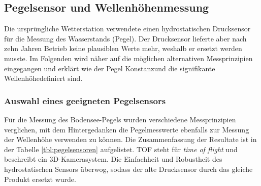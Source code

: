 \subsection{Pegelsensor und Wellenhöhenmessung}
Die ursprüngliche Wetterstation verwendete einen hydrostatischen Drucksensor für die Messung des Wasserstands (Pegel). Der Drucksensor lieferte aber nach zehn Jahren Betrieb keine plausiblen Werte mehr, weshalb er ersetzt werden musste. Im Folgenden wird näher auf die möglichen alternativen Messprinzipien eingegangen und erklärt wie der \flqq Pegel Konstanz\frqq und die \flqq signifikante Wellenhöhe\frqq definiert sind.

\subsubsection{Auswahl eines geeigneten Pegelsensors}
Für die Messung des Bodensee-Pegels wurden verschiedene Messprinzipien verglichen, mit dem Hintergedanken die Pegelmesswerte ebenfalls zur Messung der Wellenhöhe verwenden zu können. Die Zusammenfassung der Resultate ist in der Tabelle \ref{tbl:pegelsensoren} aufgelistet. TOF steht für \emph{time of flight} und beschreibt ein 3D-Kamerasystem. Die Einfachheit und Robustheit des hydrostatischen Sensors überwog, sodass der alte Drucksensor durch das gleiche Produkt ersetzt wurde.


